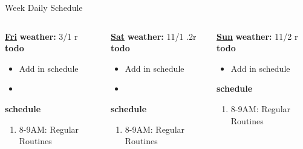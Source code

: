 \begin{columns}
\begin{column}{0.6\linewidth}
\begin{block}{Week Daily Schedule}
\begin{columns}
          \begin{column}{0.14\textwidth}{\small \underline{\bf Fri}}
            {\tiny \bf weather: } {\tiny 3/1 r} \\ 
            {\tiny \bf todo} \\ 
            \begin{itemize}
              \tiny \item \tiny Add in schedule
            \item \tiny 
            \end{itemize} 
                {\tiny \bf schedule} \\
                \begin{enumerate} 
                  \tiny \item \tiny 8-9AM: Regular Routines 
                \end{enumerate}
          \end{column}

          \begin{column}{0.15\textwidth}{\small \underline{\bf Sat}}
            {\tiny \bf weather: } {\tiny 11/1 .2r} \\ 
            { \tiny \bf todo} \\ 
            \begin{itemize}
              \tiny \item \tiny Add in schedule
            \item \tiny 
            \end{itemize} 
                {\tiny \bf schedule} \\
                \begin{enumerate} 
                  \tiny \item \tiny 8-9AM: Regular Routines 
                \end{enumerate}
          \end{column}
         
          \begin{column}{0.15\textwidth}{\small \underline{\bf Sun}}
            {\tiny {\bf weather:} } {\tiny 11/2 r} \\ 
            {\tiny {\bf todo}}\\
            \begin{itemize}
              \tiny \item \tiny Add in schedule
            \end{itemize} 
                {\tiny \bf schedule}\\
                \begin{enumerate} 
                  \tiny \item \tiny 8-9AM: Regular Routines 
                \end{enumerate}
          \end{column}
        \end{columns}
      \end{block}
\end{column}
    

\end{columns}
